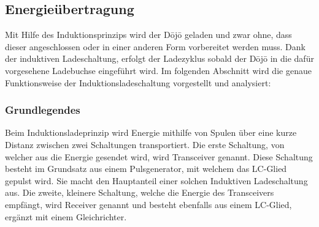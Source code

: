 \subsection{Energieübertragung}\label{sec:energieuebertragung}
Mit Hilfe des Induktionsprinzips wird der Dōjō geladen und zwar ohne, dass dieser angeschlossen oder in einer anderen Form vorbereitet werden muss. Dank der induktiven Ladeschaltung, erfolgt der Ladezyklus sobald der Dōjō in die dafür vorgesehene Ladebuchse eingeführt wird. Im folgenden Abschnitt wird die genaue Funktionsweise der Induktionsladeschaltung vorgestellt und analysiert:

\subsubsection*{Grundlegendes}
Beim Induktionsladeprinzip wird Energie mithilfe von Spulen über eine kurze Distanz zwischen zwei Schaltungen transportiert. Die erste Schaltung, von welcher aus die Energie gesendet wird, wird Transceiver genannt. Diese Schaltung besteht im Grundsatz aus einem Pulsgenerator, mit welchem das LC-Glied gepulst wird. Sie macht den Hauptanteil einer solchen Induktiven Ladeschaltung aus. Die zweite, kleinere Schaltung, welche die Energie des Transceivers empfängt, wird Receiver genannt und besteht ebenfalls aus einem LC-Glied, ergänzt mit einem Gleichrichter.

